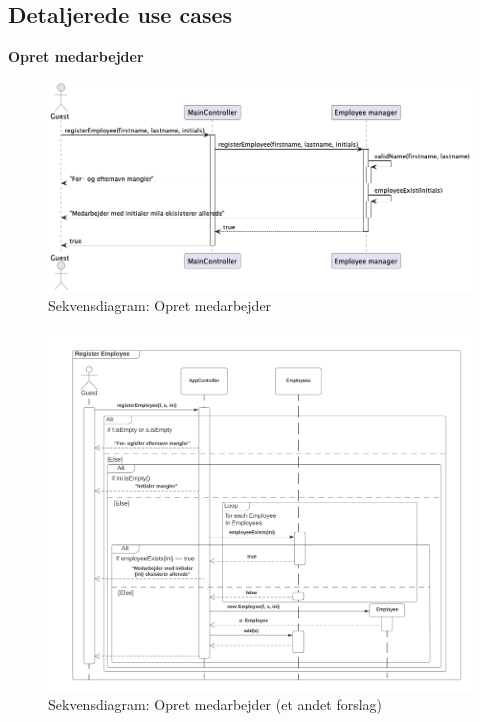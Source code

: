 \subsection{Detaljerede use cases}
\textbf{Opret medarbejder}
\begin{figure}[H]
    \centering
    \caption{Sekvensdiagram: Opret medarbejder}\label{fig:sequence_register_employee1}
    \includegraphics[width = .75\textwidth]{Diagrams/seq_register_employee.png}
\end{figure}
\begin{figure}[H]
    \centering
    \caption{Sekvensdiagram: Opret medarbejder (et andet forslag)}\label{fig:sequence_register_employee2}
    \includegraphics[width = 1\textwidth]{RequirementsAndDesign/Diagrams/Register Employee.png}
\end{figure}
